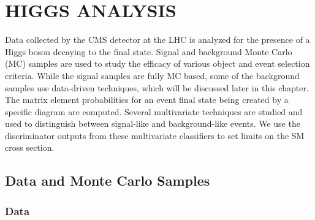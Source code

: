 %
%
%



\chapter{\texorpdfstring{\uppercase {Higgs Analysis}}{Higgs Analysis}}
\label{ch:analysis}

Data collected by the CMS detector at the LHC is analyzed for the presence of a Higgs boson decaying to the \lvjj final state.
Signal and background Monte Carlo (MC) samples are used to study the efficacy of various object and event selection criteria.
While the signal samples are fully MC based, some of the background samples use data-driven techniques, which will be discussed later in this chapter.
The matrix element probabilities for an event final state being created by a specific diagram are computed.
Several multivariate techniques are studied and used to distinguish between signal-like and background-like events.
We use the discriminator outputs from these multivariate classifiers to set limits on the SM \HWW cross section.

\section{Data and Monte Carlo Samples}


\subsection{Data}
\label{sec:data}

